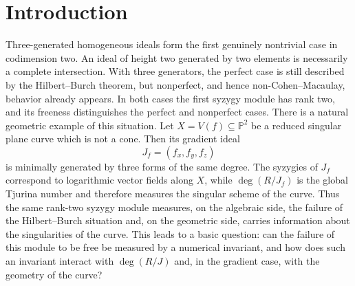 \documentclass[11pt]{amsart} %
\theoremstyle{definition}
\def\NZQ{\mathbb}               %
\def\PP{{\NZQ P}}
\begin{document}
\begin{abstract}
We study numerical invariants of homogeneous ideals generated by three
forms, with particular emphasis on the interaction between the initial
degree of the syzygy module, the multiplicity of the codimension-two
part of the ideal, and the Bourbaki degree. We extend the Bourbaki degree from gradient ideals of plane curves to arbitrary three-generated homogeneous ideals and obtain sharp numerical bounds in both the general and the equigenerated settings. In the equigenerated case, these bounds extend the du Plessis--Wall picture and lead to the study of numerical, structural, dimensional, and integrable gaps. We show that numerical admissibility does not in general imply realizability and obtain further restrictions from the minimal graded free resolution. As an application, we determine the possible Bourbaki degrees of reduced
singular quartic plane curves and describe them in terms of their singularity configurations; the possible values are $0,1,2,3,4,6,7,8$.
\end{abstract}
	\maketitle
    		


\section*{Introduction}

Three-generated homogeneous ideals form the first genuinely nontrivial
case in codimension two. An ideal of height two generated by two elements
is necessarily a complete intersection. With three generators, the
perfect case is still described by the Hilbert--Burch theorem, but
nonperfect, and hence non-Cohen--Macaulay, behavior already appears.
In both cases the first syzygy module has rank two, and its freeness distinguishes the perfect and nonperfect cases.
There is a natural geometric example of this situation. Let
$X=V(f)\subseteq\PP^2$ be a reduced singular plane curve which is not a cone.
Then its gradient ideal
\[
J_f=(f_x,f_y,f_z)
\]
is minimally generated by three forms of the same degree. The syzygies
of $J_f$ correspond to logarithmic vector fields along $X$, while
$\deg(R/J_f)$ is the global Tjurina number and therefore measures the
singular scheme of the curve. Thus the same rank-two syzygy module
measures, on the algebraic side, the failure of the Hilbert--Burch
situation and, on the geometric side, carries information about the
singularities of the curve. This leads to a basic question: can the
failure of this module to be free be measured by a numerical invariant,
and how does such an invariant interact with $\deg(R/J)$ and, in the
gradient case, with the geometry of the curve?
\end{document}
